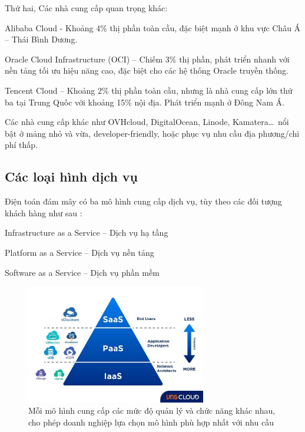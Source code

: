 \begin{myitem}
\item Thứ hai, Các nhà cung cấp quan trọng khác:
  \begin{mysubitem}
  \item Alibaba Cloud - Khoảng 4\% thị phần toàn cầu, đặc biệt mạnh ở khu vực Châu Á -- Thái Bình Dương.
  
  \item Oracle Cloud Infrastructure (OCI) -- Chiếm 3\% thị phần, phát triển nhanh với nền tảng tối ưu hiệu năng cao, đặc biệt cho các hệ thống Oracle truyền thống.
  
  \item Tencent Cloud -- Khoảng 2\% thị phần toàn cầu, nhưng là nhà cung cấp lớn thứ ba tại Trung Quốc với khoảng 15\% nội địa. Phát triển mạnh ở Đông Nam Á.
  
  \item Các nhà cung cấp khác như OVHcloud, DigitalOcean, Linode, Kamatera\ldots\ nổi bật ở mảng nhỏ và vừa, developer-friendly, hoặc phục vụ nhu cầu địa phương/chi phí thấp.
  \end{mysubitem}
\end{myitem}

\subsection{Các loại hình dịch vụ}
Điện toán đám mây có ba mô hình cung cấp dịch vụ, tùy theo các đối tượng khách hàng như sau \cite{vngcloud_iaas_paas_saas}:

\begin{myitem}
\item Infrastructure as a Service – Dịch vụ hạ tầng

\item Platform as a Service – Dịch vụ nền tảng

\item Software as a Service – Dịch vụ phần mềm

\end{myitem}

\begin{figure}[H] %
    \centering
    \includegraphics[width=0.7\textwidth]{Tong_quan_DTDM/Cac_loai_hinh_dich_vu.jpg}
    \caption{Mỗi mô hình cung cấp các mức độ quản lý và chức năng khác nhau, cho
phép doanh nghiệp lựa chọn mô hình phù hợp nhất với nhu cầu}
    \label{fig:cloud_intro}
\end{figure}

